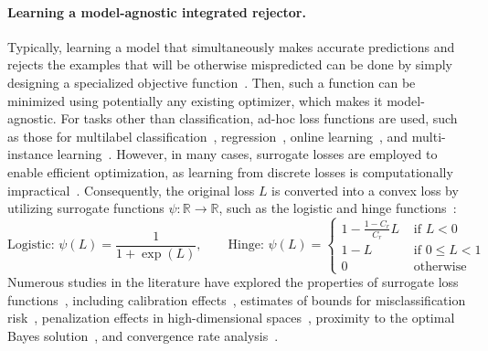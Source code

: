 \paragraph{\bf{Learning a model-agnostic integrated rejector.}}
Typically, learning a model that simultaneously makes accurate predictions and rejects the examples that will be otherwise mispredicted can be done by simply designing a specialized objective function~\citep{Mozannar2020}. Then, such a function can be minimized using potentially any existing optimizer, which makes it model-agnostic.
\changed{For instance, for classification, a simple cost-based objective for any hypothesis $m$ can be expressed as
\begin{equation*}
    L = \E_{p(X,Y)} \left[C_r \mathbbm{1}_{m(x) = \rr{}}(x) + \mathbbm{1}_{m(x) \not\in \{y,\rr{}\}}(x)\right]
\end{equation*}
with $C_r \in (0, 1/2]$.
}
For tasks other than classification, ad-hoc loss functions are used, such as those for multilabel classification~\citep{Pillai2013,Nguyen2020,Nguyen2021}, regression~\citep{Asif2020,Kalai2021}, online learning~\citep{pmlr-v80-cortes18a,Kocak2020}, and multi-instance learning~\citep{Zhang2006}. However, in many cases, surrogate losses are employed to enable efficient optimization, as learning from discrete losses is computationally impractical~\citep{Wegkamp2007,Grandvalet2009,Cao2022}. Consequently, the original loss $L$ is converted into a convex loss by utilizing surrogate functions $\psi \colon \mathbb{R} \to \mathbb{R}$, such as the logistic and hinge functions~\citep{Ramaswamy2018,Zhang2018,Bartlett2008}:
\begin{equation*}
    \text{Logistic: } \psi(L) = \frac{1}{1+ \exp(L)}, \qquad \text{Hinge: } \psi(L) =
    \begin{cases}
        1- \frac{1-C_r}{C_r} L & \text{ if } L<0\\
        1-L  & \text{ if } 0 \le L < 1\\
        0 & \text{ otherwise}
    \end{cases}
\end{equation*}
Numerous studies in the literature have explored the properties of surrogate loss functions~\citep{Yuan2010}, including calibration effects~\citep{Ni2019,Charoenphakdee2019}, estimates of bounds for misclassification risk~\citep{Shekhar2019,Kato2020}, penalization effects in high-dimensional spaces~\citep{Wegkamp2012}, proximity to the optimal Bayes solution~\citep{Bounsiar2008,Shen2020}, and convergence rate analysis~\citep{Denis2020}.

